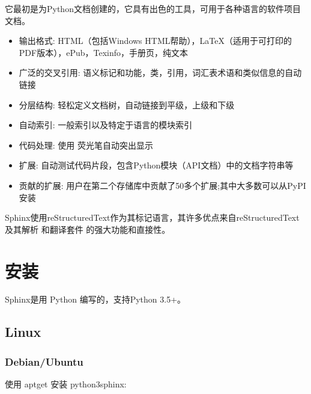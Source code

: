 \documentclass[a4paper,10pt,english]{sphinxmanual}
\begin{document}
\sphinxAtStartPar
它最初是为Python文档创建的，它具有出色的工具，可用于各种语言的软件项目文档。
\begin{itemize}
\item {} 
\sphinxAtStartPar
输出格式: HTML（包括Windows HTML帮助），LaTeX（适用于可打印的PDF版本），ePub，Texinfo，手册页，纯文本

\item {} 
\sphinxAtStartPar
广泛的交叉引用: 语义标记和功能，类，引用，词汇表术语和类似信息的自动链接

\item {} 
\sphinxAtStartPar
分层结构: 轻松定义文档树，自动链接到平级，上级和下级

\item {} 
\sphinxAtStartPar
自动索引: 一般索引以及特定于语言的模块索引

\item {} 
\sphinxAtStartPar
代码处理: 使用  荧光笔自动突出显示

\item {} 
\sphinxAtStartPar
扩展: 自动测试代码片段，包含Python模块（API文档）中的文档字符串等

\item {} 
\sphinxAtStartPar
贡献的扩展: 用户在第二个存储库中贡献了50多个扩展;其中大多数可以从PyPI安装

\end{itemize}

\sphinxAtStartPar
Sphinx使用reStructuredText作为其标记语言，其许多优点来自reStructuredText及其解析
和翻译套件  的强大功能和直接性。


\section{安装}
\label{\detokenize{sphinx_intro:id2}}
\sphinxAtStartPar
Sphinx是用 Python 编写的，支持Python 3.5+。


\subsection{Linux}
\label{\detokenize{sphinx_intro:linux}}

\subsubsection{Debian/Ubuntu}
\label{\detokenize{sphinx_intro:debian-ubuntu}}
\sphinxAtStartPar
使用 apt\sphinxhyphen{}get 安装 python3\sphinxhyphen{}sphinx:
\end{document}
